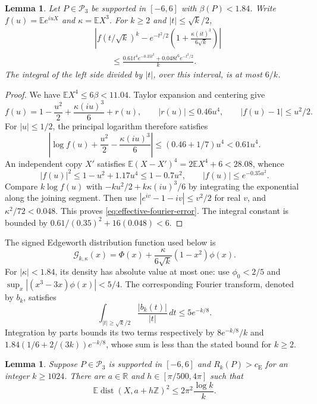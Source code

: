 \documentclass[aop]{imsart}
\theoremstyle{plain}
\newtheorem{lemma}[theorem]{Lemma}
\theoremstyle{definition}
\theoremstyle{definition}
\newcommand{\EE}{\mathbb E}
\newcommand{\R}{\mathbb R}
\newcommand{\Pthree}{\mathcal P_3}
\newcommand{\ce}{c_{\mathrm E}}
\DeclareMathOperator{\dist}{dist}
\begin{document}
\begin{lemma}\label{lem:effective-low-frequency}
Let $P\in\Pthree$ be supported in $[-6,6]$ with $\beta(P)<1.84$.
Write $f(u)=\EE e^{iuX}$ and $\kappa=\EE X^3$.  For
$k\ge2$ and $|t|\le\sqrt k/2$,
\begin{equation}\label{eq:effective-fourier-error}
\begin{split}
 &\left|f(t/\sqrt k)^k-
 e^{-t^2/2}\left(1+\frac{\kappa(it)^3}{6\sqrt k}\right)\right|\\
 &\qquad\le
 \frac{0.61t^4e^{-0.35t^2}+0.048t^6e^{-t^2/2}}{k}.
\end{split}
\end{equation}
The integral of the left side divided by $|t|$, over this interval,
is at most $6/k$.
\end{lemma}

\begin{proof}
We have $\EE X^4\le6\beta<11.04$.  Taylor expansion and centering give
\[
 f(u)=1-\frac{u^2}{2}+\frac{\kappa(iu)^3}{6}+r(u),
 \qquad |r(u)|\le0.46u^4,\qquad |f(u)-1|\le u^2/2.
\]
For $|u|\le1/2$, the principal logarithm therefore satisfies
\[
 \left|\log f(u)+\frac{u^2}{2}-\frac{\kappa(iu)^3}{6}\right|
 \le(0.46+1/7)u^4<0.61u^4.
\]
An independent copy $X'$ satisfies
$\EE(X-X')^4=2\EE X^4+6<28.08$, whence
\[
 |f(u)|^2\le1-u^2+1.17u^4\le1-0.7u^2,
 \qquad |f(u)|\le e^{-0.35u^2}.
\]
Compare $k\log f(u)$ with
$-ku^2/2+k\kappa(iu)^3/6$ by integrating the exponential along
the joining segment.  Then use $|e^{iv}-1-iv|\le v^2/2$ for real
$v$, and $\kappa^2/72<0.048$.  This proves
\eqref{eq:effective-fourier-error}.  The integral constant is bounded by
$0.61/(0.35)^2+16(0.048)<6$.
\end{proof}

The signed Edgeworth distribution function used below is
\[
 \mathcal G_{k,\kappa}(x)
 =\Phi(x)+\frac{\kappa}{6\sqrt k}(1-x^2)\phi(x).
\]
For $|\kappa|<1.84$, its density has absolute value at most one:
use $\phi_0<2/5$ and
$\sup_x|(x^3-3x)\phi(x)|<5/4$.
The corresponding Fourier transform, denoted by $b_k$, satisfies
\begin{equation}\label{eq:effective-gaussian-tail}
 \int_{|t|\ge\sqrt k/2}\frac{|b_k(t)|}{|t|}\,dt
 \le5e^{-k/8}.
\end{equation}
Integration by parts bounds its two terms respectively by
$8e^{-k/8}/k$ and
$1.84(1/6+2/(3k))e^{-k/8}$, whose sum is less than the stated
bound for $k\ge2$.

\begin{lemma}\label{lem:effective-near-lattice}
Suppose $P\in\Pthree$ is supported in $[-6,6]$ and $R_k(P)>\ce$
for an integer $k\ge1024$.  There are $a\in\R$ and
$h\in[\pi/500,4\pi]$ such that
\begin{equation}\label{eq:effective-near-lattice}
 \EE\dist(X,a+h\mathbb Z)^2\le2\pi^2\frac{\log k}{k}.
\end{equation}
\end{lemma}
\end{document}
